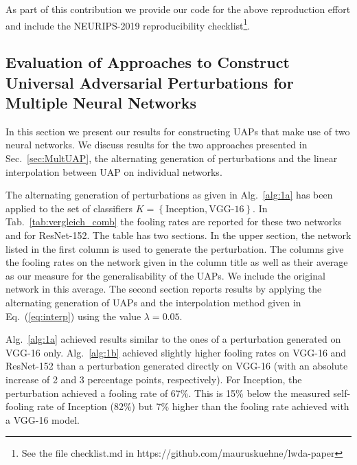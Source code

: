 \documentclass[runningheads]{llncs}
\begin{document}
As part of this contribution we provide our code for the above reproduction effort and include the NEURIPS-2019 reproducibility checklist\footnote{See the file checklist.md in https://github.com/mauruskuehne/lwda-paper}.

\subsection{Evaluation of Approaches to Construct Universal Adversarial Perturbations for Multiple Neural Networks}\label{sec:EvaluationCombined}
In this section we present our results for constructing UAPs that make use of two neural networks. We discuss results for the two approaches presented in Sec.~\ref{sec:MultUAP}, the alternating generation of perturbations and the linear interpolation between UAP on individual networks.

The alternating generation of perturbations as given in Alg.~\ref{alg:1a} has been applied to the set of classifiers \(K=\left\{\text{Inception},\text{VGG-16}\right\}\). In Tab.~\ref{tab:vergleich_comb} the fooling rates are reported for these two networks and for ResNet-152. The table has two sections. In the upper section, the network listed in the first column is used to generate the perturbation. The columns give the fooling rates on the network given in the column title as well as their average as our measure for the generalisability of the UAPs. We include the original network in this average. 
The second section reports results by applying the alternating generation of UAPs and the interpolation method given in Eq.~(\ref{eq:interp}) using the value $\lambda=0.05$. 

Alg.~\ref{alg:1a} achieved results similar to the ones of a perturbation generated on VGG-16 only. Alg.~\ref{alg:1b} achieved slightly higher fooling rates on VGG-16 and ResNet-152 than a perturbation generated directly on VGG-16 (with an absolute increase of 2 and 3 percentage points, respectively). For Inception, the perturbation achieved a fooling rate of 67\%. This is 15\% below the measured self-fooling rate of Inception (82\%) but 7\% higher than the fooling rate achieved with a VGG-16 model. 
\end{document}
